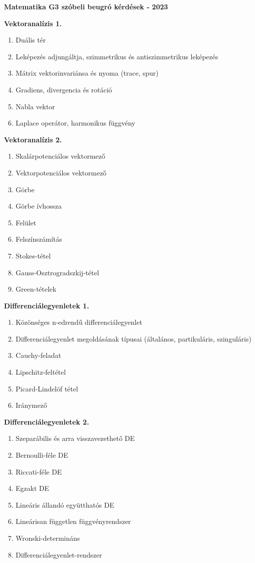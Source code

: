 \documentclass[11pt,a4paper]{article}
\begin{document}
\newpage
\begin{center}
    \Large \textbf{Matematika G3 szóbeli beugró kérdések - 2023}
 \end{center}
 \textbf{Vektoranalízis 1.}
 \begin{enumerate}
    \item Duális tér
    \item Leképezés adjungáltja, szimmetrikus és antiszimmetrikus leképezés
    \item Mátrix vektorinvariánsa és nyoma (trace, spur)
    \item Gradiens, divergencia és rotáció
    \item Nabla vektor
    \item Laplace operátor, harmonikus függvény
 \end{enumerate}
 \textbf{Vektoranalízis 2.}
 \begin{enumerate}
    \item Skalárpotenciálos vektormező
    \item Vektorpotenciálos vektormező
    \item Görbe
    \item Görbe ívhossza
    \item Felület
    \item Felszínszámítás
    \item Stokes-tétel
    \item Gauss-Osztrogradszkij-tétel
    \item Green-tételek
 \end{enumerate}
 \textbf{Differenciálegyenletek 1.}
 \begin{enumerate}
    \item Közönséges n-edrendű differenciálegyenlet
    \item Differenciálegyenlet megoldásának típusai (általános, partikuláris, szinguláris)
    \item Cauchy-feladat
    \item Lipschitz-feltétel
    \item Picard-Lindelöf tétel
    \item Iránymező
 \end{enumerate}
 \textbf{Differenciálegyenletek 2.}
 \begin{enumerate}
    \item Szeparábilis és arra visszavezethető DE
    \item Bernoulli-féle DE
    \item Riccati-féle DE
    \item Egzakt DE
    \item Lineáris állandó együtthatós DE
    \item Lineárisan független függvényrendszer
    \item Wronski-determináns
    \item Differenciálegyenlet-rendszer
 \end{enumerate}
\end{document}
